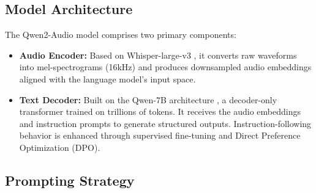 \documentclass{Interspeech}
\begin{document}
\subsection{Model Architecture}

The Qwen2-Audio model comprises two primary components:
\begin{itemize}
    \item \textbf{Audio Encoder:} Based on Whisper-large-v3 \cite{radford2023robust}, it converts raw waveforms into mel-spectrograms (16kHz) and produces downsampled audio embeddings aligned with the language model's input space.
    \item \textbf{Text Decoder:} Built on the Qwen-7B architecture \cite{bai2023qwen}, a decoder-only transformer trained on trillions of tokens. It receives the audio embeddings and instruction prompts to generate structured outputs. Instruction-following behavior is enhanced through supervised fine-tuning and Direct Preference Optimization (DPO).
\end{itemize}

\subsection{Prompting Strategy}



\end{document}
